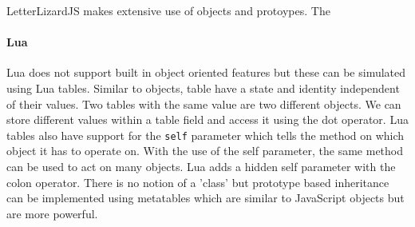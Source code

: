 LetterLizardJS makes extensive use of objects and protoypes. The 

\paragraph{Lua}
Lua does not support built in object oriented features but these can be simulated using Lua tables. Similar to objects, table have a state and identity independent of their values. Two tables with the same value are two different objects. We can store different values within a table field and access it using the dot operator. Lua tables also have support for the \texttt{self} parameter which tells the method on which object it has to operate on. With the use of the self parameter, the same method can be used to act on many objects. Lua adds a hidden self parameter with the colon operator. There is no notion of a 'class' but prototype based inheritance can be implemented using metatables which are similar to JavaScript objects but are more powerful. 
